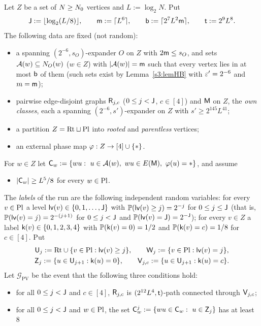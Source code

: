 \begin{lemma}\label{s4:lemPV}
Let $Z$ be a set of $N\ge N_{0}$ vertices and $L:=\log_2N$. Put
\[
\mathsf{J}:=\lfloor\log_2(L/8)\rfloor,\qquad \mathsf{m}:=\lceil L^6\rceil,\qquad \mathsf{b}:=\lceil2^7L^2\mathsf{m}\rceil,\qquad
\mathsf{t}:=2^9L^8 .
\]
The following data are fixed (not random):
\begin{itemize}
\item a spanning $(2^{-6},s_O)$-expander $O$ on $Z$ with $2\mathsf{m}\le s_O$, and sets $\mathcal{A}(w)\subseteq N_O(w)$ ($w\in Z$)
  with $|\mathcal{A}(w)|=\mathsf{m}$ such that every vertex lies in at most $\mathsf{b}$ of them (such sets exist by
  Lemma~\ref{s3:lemHB} with $\varepsilon'=2^{-6}$ and $m=\mathsf{m}$);
\item pairwise edge-disjoint graphs $\mathsf{R}_{j,c}$ ($0\le j<\mathsf{J}$, $c\in[4]$) and $\mathsf{M}$ on $Z$, the \emph{own classes},
  each a spanning $(2^{-6},s')$-expander on $Z$ with $s'\ge2^{145}L^{41}$;
\item a partition $Z=\mathrm{Rt}\sqcup\mathrm{Pl}$ into \emph{rooted} and \emph{parentless} vertices;
\item an external phase map $\varphi:Z\to[4]\cup\{*\}$.
\end{itemize}
For $w\in Z$ let $\vC_w:=\{wu:\ u\in\Aw(w),\ wu\in E(\vM),\ \extph(u)=*\}$, and assume
\begin{itemize}
\item[(E1$'$)] $|\mathsf{C}_w|\ge L^5/8$ for every $w\in\mathrm{Pl}$.
\end{itemize}
The \emph{labels} of the run are the following independent random variables: for every $v\in\mathrm{Pl}$ a level
$\mathsf{lv}(v)\in\{0,1,\dots,\mathsf{J}\}$ with $\mathbb{P}(\mathsf{lv}(v)\ge j)=2^{-j}$ for $0\le j\le\mathsf{J}$ (that is,
$\mathbb{P}(\mathsf{lv}(v)=j)=2^{-(j+1)}$ for $0\le j<\mathsf{J}$ and $\mathbb{P}(\mathsf{lv}(v)=\mathsf{J})=2^{-\mathsf{J}}$); for every $v\in Z$ a label
$\mathsf{k}(v)\in\{0,1,2,3,4\}$ with $\mathbb{P}(\mathsf{k}(v)=0)=1/2$ and $\mathbb{P}(\mathsf{k}(v)=c)=1/8$ for $c\in[4]$. Put
\begin{gather*}
\mathsf{U}_j:=\mathrm{Rt}\cup\{v\in\mathrm{Pl}:\mathsf{lv}(v)\ge j\},\qquad \mathsf{W}_j:=\{v\in\mathrm{Pl}:\mathsf{lv}(v)=j\},\\
\mathsf{Z}_j:=\{u\in\mathsf{U}_{j+1}:\mathsf{k}(u)=0\},\qquad \mathsf{V}_{j,c}:=\{u\in\mathsf{U}_{j+1}:\mathsf{k}(u)=c\}.
\end{gather*}
Let $\mathcal G_{\mathrm{PV}}$ be the event that the following three conditions hold:
\begin{itemize}
\item[(G2)] for all $0\le j<\mathsf{J}$ and $c\in[4]$, $\mathsf{R}_{j,c}$ is $(2^{12}L^4,\mathsf{t})$-path connected through $\mathsf{V}_{j,c}$;
\item[(G4)] for all $0\le j<\mathsf{J}$ and $w\in\mathrm{Pl}$, the set $\mathsf{C}^j_w:=\{wu\in\mathsf{C}_w:\ u\in\mathsf{Z}_j\}$ has at least $8$

\end{itemize}
\end{lemma}
